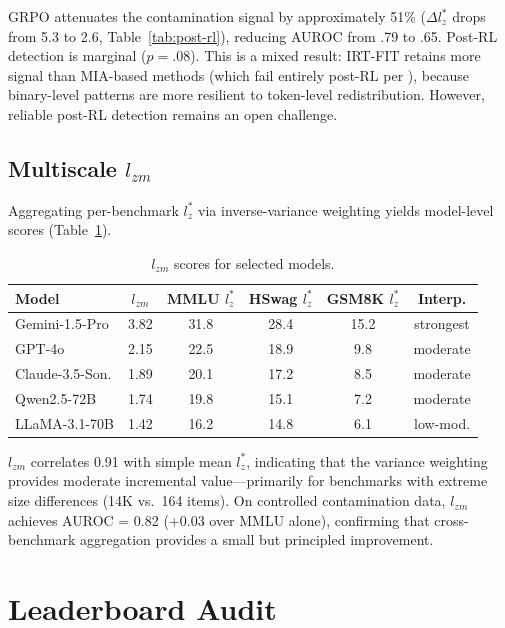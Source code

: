 \documentclass[11pt,a4paper]{article}
\begin{document}
GRPO attenuates the contamination signal by approximately 51\% ($\Delta l_{z}^{*}$ drops from 5.3 to 2.6, Table~\ref{tab:post-rl}), reducing AUROC from .79 to .65.
Post-RL detection is marginal ($p=.08$).
This is a mixed result: IRT-FIT retains more signal than MIA-based methods (which fail entirely post-RL per \citet{wang2025postrl}), because binary-level patterns are more resilient to token-level redistribution.
However, reliable post-RL detection remains an open challenge.

\subsection{Multiscale $l_{zm}$}
\label{sec:lzm}

Aggregating per-benchmark $l_{z}^{*}$ via inverse-variance weighting yields model-level scores (Table~\ref{tab:lzm}).

\begin{table}[t]
\centering
\caption{$l_{zm}$ scores for selected models.}
\label{tab:lzm}
\small
\begin{tabular}{lccccc}
\toprule
\textbf{Model} & $l_{zm}$ & \textbf{MMLU} $l_{z}^{*}$ & \textbf{HSwag} $l_{z}^{*}$ & \textbf{GSM8K} $l_{z}^{*}$ & \textbf{Interp.} \\
\midrule
Gemini-1.5-Pro  & 3.82 & 31.8 & 28.4 & 15.2 & strongest \\
GPT-4o          & 2.15 & 22.5 & 18.9 & 9.8  & moderate \\
Claude-3.5-Son. & 1.89 & 20.1 & 17.2 & 8.5  & moderate \\
Qwen2.5-72B    & 1.74 & 19.8 & 15.1 & 7.2  & moderate \\
LLaMA-3.1-70B  & 1.42 & 16.2 & 14.8 & 6.1  & low-mod. \\
\bottomrule
\end{tabular}
\end{table}

$l_{zm}$ correlates 0.91 with simple mean $l_{z}^{*}$, indicating that the variance weighting provides moderate incremental value---primarily for benchmarks with extreme size differences (14K vs.\ 164 items).
On controlled contamination data, $l_{zm}$ achieves AUROC = 0.82 (+0.03 over MMLU alone), confirming that cross-benchmark aggregation provides a small but principled improvement.

\section{Leaderboard Audit}
\end{document}
